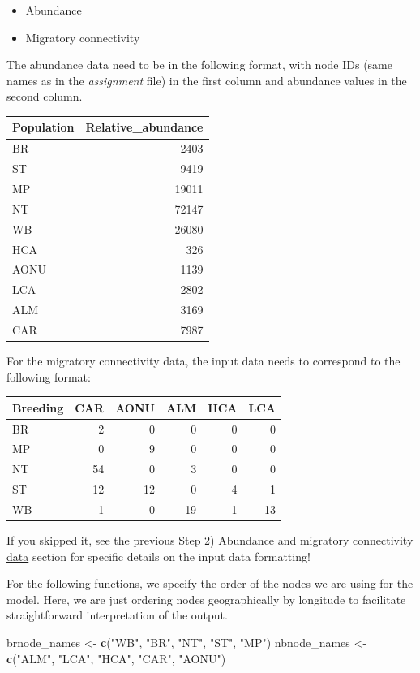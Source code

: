 \documentclass[
]{book}
\newenvironment{Shaded}{\begin{snugshade}}{\end{snugshade}}
\newcommand{\FunctionTok}[1]{\textcolor[rgb]{0.13,0.29,0.53}{\textbf{#1}}}
\newcommand{\NormalTok}[1]{#1}
\newcommand{\OtherTok}[1]{\textcolor[rgb]{0.56,0.35,0.01}{#1}}
\newcommand{\StringTok}[1]{\textcolor[rgb]{0.31,0.60,0.02}{#1}}
\providecommand{\tightlist}{%
  \setlength{\itemsep}{0pt}\setlength{\parskip}{0pt}}
\begin{document}
\begin{itemize}
\tightlist
\item
  Abundance
\item
  Migratory connectivity
\end{itemize}

The abundance data need to be in the following format, with node IDs (same names as in the \emph{assignment} file) in the first column and abundance values in the second column.

\begin{tabular}{l|r}
\hline
Population & Relative\_abundance\\
\hline
BR & 2403\\
\hline
ST & 9419\\
\hline
MP & 19011\\
\hline
NT & 72147\\
\hline
WB & 26080\\
\hline
HCA & 326\\
\hline
AONU & 1139\\
\hline
LCA & 2802\\
\hline
ALM & 3169\\
\hline
CAR & 7987\\
\hline
\end{tabular}

For the migratory connectivity data, the input data needs to correspond to the following format:

\begin{tabular}{l|r|r|r|r|r}
\hline
Breeding & CAR & AONU & ALM & HCA & LCA\\
\hline
BR & 2 & 0 & 0 & 0 & 0\\
\hline
MP & 0 & 9 & 0 & 0 & 0\\
\hline
NT & 54 & 0 & 3 & 0 & 0\\
\hline
ST & 12 & 12 & 0 & 4 & 1\\
\hline
WB & 1 & 0 & 19 & 1 & 13\\
\hline
\end{tabular}

If you skipped it, see the previous \protect\hyperlink{data}{Step 2) Abundance and migratory connectivity data} section for specific details on the input data formatting!

For the following functions, we specify the order of the nodes we are using for the model. Here, we are just ordering nodes geographically by longitude to facilitate straightforward interpretation of the output.

\begin{Shaded}
\begin{Highlighting}[]
\NormalTok{brnode\_names }\OtherTok{\textless{}{-}} \FunctionTok{c}\NormalTok{(}\StringTok{"WB"}\NormalTok{, }\StringTok{"BR"}\NormalTok{, }\StringTok{"NT"}\NormalTok{, }\StringTok{"ST"}\NormalTok{, }\StringTok{"MP"}\NormalTok{)}
\NormalTok{nbnode\_names }\OtherTok{\textless{}{-}} \FunctionTok{c}\NormalTok{(}\StringTok{"ALM"}\NormalTok{, }\StringTok{"LCA"}\NormalTok{, }\StringTok{"HCA"}\NormalTok{, }\StringTok{"CAR"}\NormalTok{, }\StringTok{"AONU"}\NormalTok{)}
\end{Highlighting}
\end{Shaded}
\end{document}
